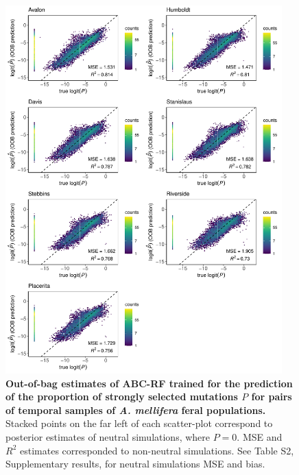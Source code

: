 \documentclass[a4paper, 12pt]{article}
\begin{document}
\begin{figure}[ht]
  \centering
  \includegraphics[width=0.95\textwidth]{Figures/FigureS18_combined_plot_pstrong.pdf}
  \small\caption{\textbf{Out-of-bag estimates of ABC-RF trained for the prediction of the proportion of strongly selected mutations $P$ for pairs of temporal samples of \textit{A. mellifera} feral populations.} Stacked points on the far left of each scatter-plot correspond to posterior estimates of neutral simulations, where $P = 0$. MSE and $R^2$ estimates corresponded to non-neutral simulations. See Table S2, Supplementary results, for neutral simulations MSE and bias.}
  \label{fig:supple_feralbee_pstrong}
\end{figure}
\end{document}
